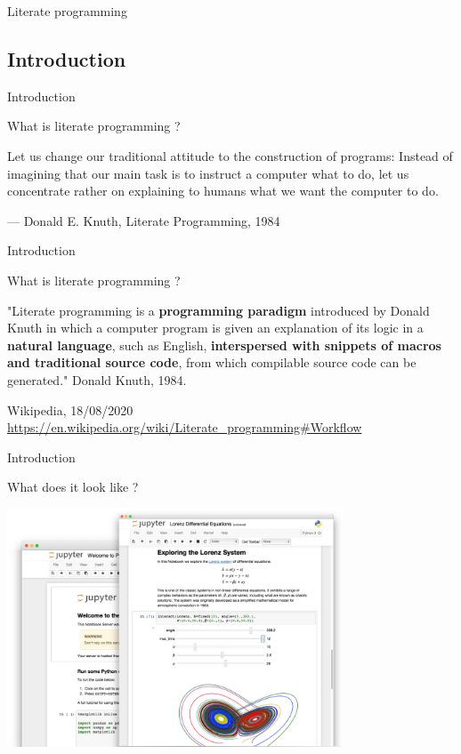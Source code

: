 \begin{frame}%

\huge{Literate programming}

\end{frame}

\subsection{Introduction}

\begin{frame}{Introduction}

What is literate programming ?

    Let us change our traditional attitude to the construction of programs: Instead of imagining that our main task is to instruct a computer what to do, let us concentrate rather on explaining to humans what we want the computer to do.

    — Donald E. Knuth, Literate Programming, 1984
\end{frame}

\begin{frame}{Introduction}

What is literate programming ?

\begin{definition}
"Literate programming is a \textbf{programming paradigm} introduced by Donald Knuth in which a computer program is given an explanation of its logic in a \textbf{natural language}, such as English, \textbf{interspersed with snippets of macros and traditional source code}, from which compilable source code can be generated." Donald Knuth, 1984.
\end{definition}

Wikipedia, 18/08/2020 \url{https://en.wikipedia.org/wiki/Literate\_programming\#Workflow}
\end{frame}


\begin{frame}{Introduction}

What does it look like ?

\centering\includegraphics[width=10cm]{07_notebook/images/literate_programming.png}

\end{frame}

